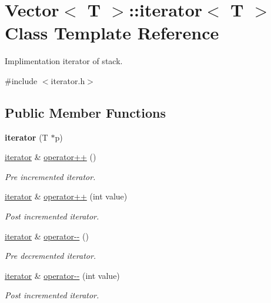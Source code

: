 \hypertarget{classVector_1_1iterator}{}\section{Vector$<$ T $>$\+:\+:iterator$<$ T $>$ Class Template Reference}
\label{classVector_1_1iterator}


Implimentation iterator of stack.  




{\ttfamily \#include $<$iterator.\+h$>$}

\subsection*{Public Member Functions}
\begin{DoxyCompactItemize}
\item 
\mbox{\label{classVector_1_1iterator_a30d2ea1f84460afa51f388b40b3532f1}} 
{\bfseries iterator} (T $\ast$p)
\item 
\hyperlink{classVector_1_1iterator}{iterator} \& \hyperlink{classVector_1_1iterator_a2e6098221d0a8b40c753819138a2d710}{operator++} ()
\begin{DoxyCompactList}\small\item\em Pre incremented iterator. \end{DoxyCompactList}\item 
\hyperlink{classVector_1_1iterator}{iterator} \& \hyperlink{classVector_1_1iterator_a8e9cf2d45f325d1ed8979706ca97f498}{operator++} (int value)
\begin{DoxyCompactList}\small\item\em Post incremented iterator. \end{DoxyCompactList}\item 
\hyperlink{classVector_1_1iterator}{iterator} \& \hyperlink{classVector_1_1iterator_a00fc1009bd761df83fd96b314d07d60d}{operator-\/-\/} ()
\begin{DoxyCompactList}\small\item\em Pre decremented iterator. \end{DoxyCompactList}\item 
\hyperlink{classVector_1_1iterator}{iterator} \& \hyperlink{classVector_1_1iterator_ab9fe4e94caea68d0460baebb6c224bb6}{operator-\/-\/} (int value)
\begin{DoxyCompactList}\small\item\em Post incremented iterator. \end{DoxyCompactList}\item 

\end{DoxyCompactItemize}
